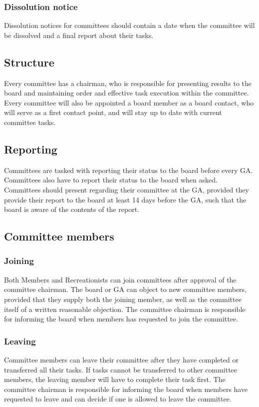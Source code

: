 \documentclass[a4paper]{article}
\begin{document}
\subsubsection{Dissolution notice}
Dissolution notices for committees should contain a date when the committee will be dissolved and a final report about their tasks.

\subsection{Structure}
Every committee has a chairman, who is responsible for presenting results to the board and maintaining order and effective task execution within the committee. Every committee will also be appointed a board member as a board contact, who will serve as a first contact point, and will stay up to date with current committee tasks.

\subsection{Reporting}
Committees are tasked with reporting their status to the board before every { GA}. Committees also have to report their status to the board when asked. Committees should present regarding their committee at the { GA}, provided they provide their report to the board at least 14 days before the { GA}, such that the board is aware of the contents of the report.

\subsection{Committee members}
\subsubsection{Joining}
Both { Members} and { Recreationists} can join committees after approval of the committee chairman. The board or { GA} can object to new committee members, provided that they supply both the joining member, as well as the committee itself of a written reasonable objection. The committee chairman is responsible for informing the board when members has requested to join the committee.

\subsubsection{Leaving}
Committee members can leave their committee after they have completed or transferred all their tasks. If tasks cannot be transferred to other committee members, the leaving member will have to complete their task first. The committee chairman is responsible for informing the board when members have requested to leave and can decide if one is allowed to leave the committee. \\ 
\end{document}
